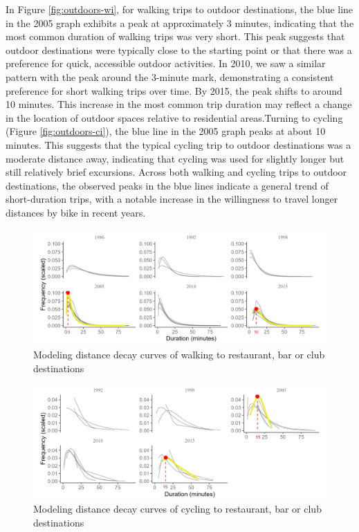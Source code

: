 \documentclass[12pt,twoside]{reedthesis}
\begin{document}
In Figure \ref{fig:outdoors-wi}, for walking trips to outdoor destinations, the blue line in the 2005 graph exhibits a peak at approximately 3 minutes, indicating that the most common duration of walking trips was very short. This peak suggests that outdoor destinations were typically close to the starting point or that there was a preference for quick, accessible outdoor activities. In 2010, we saw a similar pattern with the peak around the 3-minute mark, demonstrating a consistent preference for short walking trips over time. By 2015, the peak shifts to around 10 minutes. This increase in the most common trip duration may reflect a change in the location of outdoor spaces relative to residential areas.Turning to cycling (Figure \ref{fig:outdoors-ci}), the blue line in the 2005 graph peaks at about 10 minutes. This suggests that the typical cycling trip to outdoor destinations was a moderate distance away, indicating that cycling was used for slightly longer but still relatively brief excursions. Across both walking and cycling trips to outdoor destinations, the observed peaks in the blue lines indicate a general trend of short-duration trips, with a notable increase in the willingness to travel longer distances by bike in recent years.

\newpage
\thispagestyle{empty}
\begin{landscape}
\begin{figure}

{\centering \includegraphics[width=0.9\linewidth]{restaurant-wi} 

}

\caption{Modeling distance decay curves of walking to restaurant, bar or club destinations}\label{fig:restaurant-wi}
\end{figure}
\begin{figure}

{\centering \includegraphics[width=0.9\linewidth]{restaurant-ci} 

}

\caption{Modeling distance decay curves of cycling to restaurant, bar or club destinations}\label{fig:restaurant-ci}
\end{figure}
\end{landscape}
\clearpage
\end{document}
